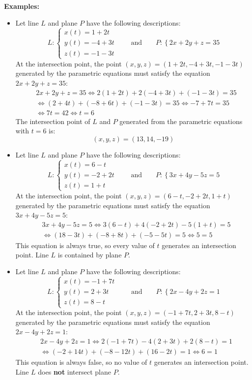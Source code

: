 \documentclass{article}
\begin{document}
\textbf{Examples:}
\begin{itemize}
\item Let line \(L\) and plane \(P\) have the following descriptions:
\[L : \left\{\begin{array}{c}
x(t) = 1 + 2t \\ 
y(t) = -4 + 3t \\ 
z(t) = -1 - 3t
\end{array}\right. \quad\quad\text{and}\quad\quad 
P : \left\{2x + 2y + z = 35\right.\]
At the intersection point, the point \((x, y, z) = (1 + 2t, -4 + 3t, -1 - 3t)\) generated by the parametric equations must satisfy the equation \(2x + 2y + z = 35\):
\begin{align*}
& 2x + 2y + z = 35 
\iff 2(1 + 2t) + 2(-4 + 3t) + (-1 - 3t) = 35 \\  
& \iff (2 + 4t) + (-8 + 6t) + (-1 - 3t) = 35 
\iff -7 + 7t = 35 \\ 
& \iff 7t = 42 
\iff t = 6  
\end{align*}
The intersection point of \(L\) and \(P\) generated from the parametric equations with \(t = 6\) is:
\[(x, y, z) = (13, 14, -19)\]
\item Let line \(L\) and plane \(P\) have the following descriptions:
\[L : \left\{\begin{array}{c}
x(t) = 6 - t \\ 
y(t) = -2 + 2t \\ 
z(t) = 1 + t
\end{array}\right. \quad\quad\text{and}\quad\quad 
P : \left\{3x + 4y - 5z = 5\right.\]
At the intersection point, the point \((x, y, z) = (6 - t, -2 + 2t, 1 + t)\) generated by the parametric equations must satisfy the equation \(3x + 4y - 5z = 5\):
\begin{align*}
& 3x + 4y - 5z = 5 
\iff 3(6 - t) + 4(-2 + 2t) - 5(1 + t) = 5 \\  
& \iff (18 - 3t) + (-8 + 8t) + (-5 - 5t) = 5 
\iff 5 = 5 
\end{align*}
This equation is always true, so every value of \(t\) generates an intersection point. Line \(L\) is contained by plane \(P\).
\item Let line \(L\) and plane \(P\) have the following descriptions:
\[L : \left\{\begin{array}{c}
x(t) = -1 + 7t \\ 
y(t) = 2 + 3t \\ 
z(t) = 8 - t
\end{array}\right. \quad\quad\text{and}\quad\quad 
P : \left\{2x - 4y + 2z = 1\right.\]
At the intersection point, the point \((x, y, z) = (-1 + 7t, 2 + 3t, 8 - t)\) generated by the parametric equations must satisfy the equation \(2x - 4y + 2z = 1\):
\begin{align*}
& 2x - 4y + 2z = 1 
\iff 2(-1 + 7t) - 4(2 + 3t) + 2(8 - t) = 1 \\  
& \iff (-2 + 14t) + (-8 - 12t) + (16 - 2t) = 1 
\iff 6 = 1 
\end{align*}
This equation is always false, so no value of \(t\) generates an intersection point. Line \(L\) does {\bf not} intersect plane \(P\).
\end{itemize}  
\end{document}
